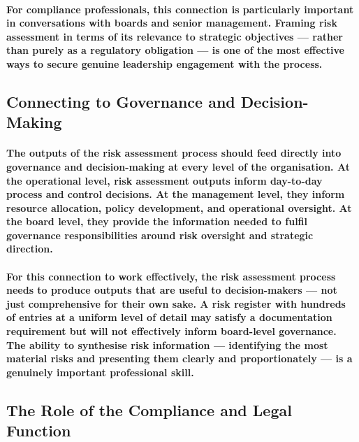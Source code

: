 \paragraph{For compliance professionals, this connection is particularly important in conversations with boards and senior management. Framing risk assessment in terms of its relevance to strategic objectives — rather than purely as a regulatory obligation — is one of the most effective ways to secure genuine leadership engagement with the process.}

\subsection{Connecting to Governance and Decision-Making}
\paragraph{The outputs of the risk assessment process should feed directly into governance and decision-making at every level of the organisation. At the operational level, risk assessment outputs inform day-to-day process and control decisions. At the management level, they inform resource allocation, policy development, and operational oversight. At the board level, they provide the information needed to fulfil governance responsibilities around risk oversight and strategic direction.}
\paragraph{For this connection to work effectively, the risk assessment process needs to produce outputs that are useful to decision-makers — not just comprehensive for their own sake. A risk register with hundreds of entries at a uniform level of detail may satisfy a documentation requirement but will not effectively inform board-level governance. The ability to synthesise risk information — identifying the most material risks and presenting them clearly and proportionately — is a genuinely important professional skill.}

\subsection{The Role of the Compliance and Legal Function}
